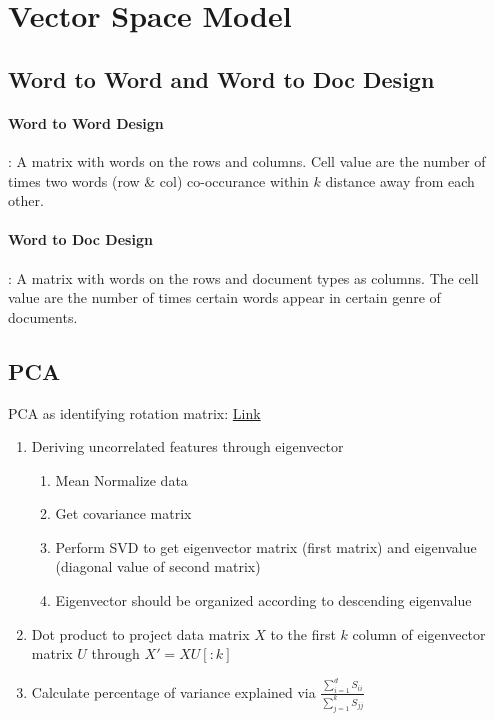 \section{Vector Space Model} 
\subsection{Word to Word and Word to Doc Design} 
\paragraph{Word to Word Design}: A matrix with words on the rows and columns. Cell value are the number of times two words (row \& col) co-occurance within $k$ distance away from each other. 

\paragraph{Word to Doc Design}: A matrix with words on the rows and document types as columns. The cell value are the number of times certain words appear in certain genre of documents. 


\subsection{PCA}
PCA as identifying rotation matrix: \href{https://drive.google.com/file/d/1M7jtWcFcK-eakfO47cCssHSuuiZyS9TK/view?usp=sharing}{Link}
\begin{enumerate}
    \item Deriving uncorrelated features through eigenvector
        \begin{enumerate}
            \item Mean Normalize data
            \item Get covariance matrix 
            \item Perform SVD to get eigenvector matrix (first matrix) and eigenvalue (diagonal value of second matrix)
            \item Eigenvector should be organized according to descending eigenvalue
        \end{enumerate}
    \item Dot product to project data matrix $X$ to the first $k$ column of eigenvector matrix $U$ through $X' = XU[:k]$
    \item Calculate percentage of variance explained via $\frac{\sum_{i=1}^{d} S_{ii}}{\sum_{j=1}^k S_{jj}}$
\end{enumerate}



